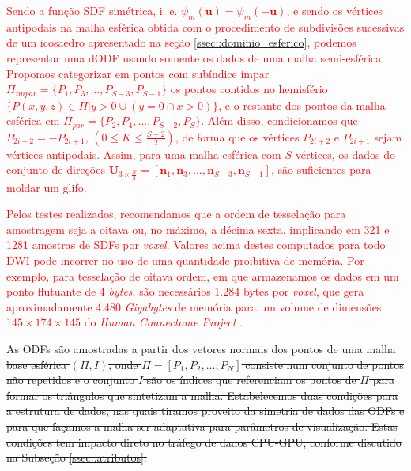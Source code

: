 \textcolor{red}{Sendo a função SDF simétrica, i. e. $\psi_m(\mathbf{u}) = \psi_m(-\mathbf{u})$, e sendo os vértices antipodais na malha esférica obtida com o procedimento de subdivisões sucessivas de um icosaedro apresentado na seção \ref{ssec::dominio_esferico}, podemos representar uma dODF usando somente os dados de uma malha semi-esférica. Propomos categorizar em pontos com subíndice ímpar $\Pi_{impar} = \{P_1, P_3, ..., P_{S-3}, P_{S-1}\}$ os pontos contidos no hemisfério $\{P(x, y, z) \in \Pi | y > 0 \cup (y = 0 \cap x > 0)\}$, e o restante dos pontos da malha esférica em $\Pi_{par} = \{P_2, P_4, ..., P_{S-2}, P_{S}\}$. Além disso, condicionamos que $P_{2i+2} = -P_{2i+1}$, $(0 \leq K \leq \frac{S-2}{2})$, de forma que os vértices $P_{2i+2}$ e $P_{2i+1}$ sejam vértices antipodais. Assim, para uma malha esférica com $S$ vértices, os dados do conjunto de direções $\mathbf{U}_{3\times \frac{N}{2}} = [
\mathbf{n}_1,
\mathbf{n}_3, ..., 
\mathbf{n}_{S-3},
\mathbf{n}_{S-1}
]$, são suficientes para moldar um glifo.}

\textcolor{red}{Pelos testes realizados, recomendamos que a ordem de tesselação para amostragem seja a oitava ou, no máximo, a décima sexta, implicando em 321 e 1281 amostras de SDFs por \textit{voxel}. Valores acima destes computados para todo DWI pode incorrer no uso de uma quantidade proibitiva de memória. Por exemplo, para tesselação de oitava ordem, em que armazenamos os dados em um ponto flutuante de 4 \textit{bytes}, são necessários 1.284 bytes por \textit{voxel}, que gera aproximadamente 4.480 \textit{Gigabytes} de memória para um volume de \textcolor{red}{dimensões} $145 \times 174 \times 145$ do \textit{Human Connectome Project} \cite{essen2012}.}



\sout{As ODFs são amostradas a partir dos vetores normais dos pontos de uma malha base esférica $(\Pi, I)$, onde $\Pi = [P_1, P_2, \dots, P_N]$ consiste num conjunto de pontos não repetidos e o conjunto $I$ são os índices que referenciam os pontos de $\Pi$ para formar os triângulos que sintetizam a malha. Estabelecemos duas condições para a estrutura de dados, nas quais tiramos proveito da simetria de dados das ODFs e para que façamos a malha ser adaptativa para parâmetros de visualização. Estas condições tem impacto direto no tráfego de dados CPU-GPU, conforme discutido na Subseção \ref{ssec::atributos}.
}

